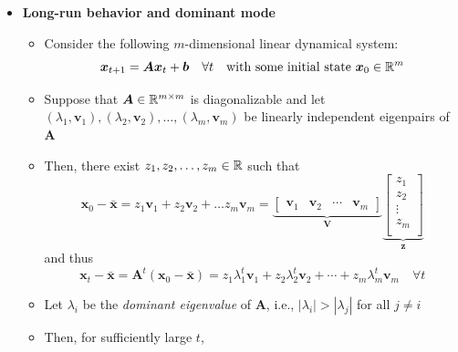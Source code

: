 \documentclass[12pt,a4paper]{article}
\begin{document}
\begin{itemize}
\begin{itemize}
    
  \end{itemize}

\item \textbf{Long-run behavior and dominant mode}
  \begin{itemize}
  \item Consider the following $m$-dimensional linear dynamical system:
    \begin{equation}\nonumber%
      \bm{x}_{t+1}
      =
      \bm{A}
      \bm{x}_{t} + \bm{b}
      \quad \forall t\quad
      \text{with some initial state $\bm{x}_{0}\in \R^{m}$}
    \end{equation}
   
  \item Suppose that $\bm{A}\in \mathbb{R}^{m\times m}$ is diagonalizable
    and let
    $(\lambda_{1}, \bm{v}_{1}), (\lambda_{2}, \bm{v}_{2}), \ldots, (\lambda_{m}, \bm{v}_{m})$
    be linearly independent eigenpairs of $\bm{A}$
  \item Then, 
    there exist $z_{1}, z_{2}, \ldots, z_{m}\in \mathbb{R}$ such that
    \begin{equation}\nonumber%
      \bm{x}_{0} - \bar{\bm{x}}
      = z_{1}\bm{v}_{1} + z_{2}\bm{v}_{2}+ \ldots z_{m}\bm{v}_{m}
      =
      \underbrace{\begin{bmatrix}
        \bm{v}_{1} & \bm{v}_{2} & \cdots & \bm{v}_{m}
      \end{bmatrix}}_{\bm{V}}
    \underbrace{
      \begin{bmatrix}
        z_{1} \\
        z_{2} \\
        \vdots \\
        z_{m} \\
      \end{bmatrix}}_{\bm{z}}
    \end{equation}
    and thus
    \begin{equation}\nonumber%
      \bm{x}_{t} - \bar{\bm{x}}
      = \bm{A}^{t}(\bm{x}_{0}-\bar{\bm{x}})
      = z_{1}\lambda_{1}^{t}\bm{v}_{1} + z_{2}\lambda_{2}^{t}\bm{v}_{2} + \cdots + z_{m}\lambda_{m}^{t}\bm{v}_{m}
      \quad \forall t
    \end{equation}
  \item Let $\lambda_{i}$ be the \emph{dominant eigenvalue} of $\bm{A}$, i.e., 
    $|\lambda_{i}|> |\lambda_{j}|$ for all $j\neq i$
  \item Then, for sufficiently large $t$, 
    \begin{equation}\nonumber%

\end{equation}
\end{itemize}
\end{itemize}
\end{document}
